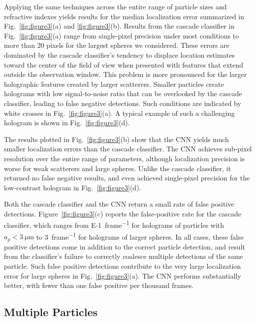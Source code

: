 Applying the same techniques across the entire range of particle
sizes and refractive indexes yields results for the median
localization error summarized in
Fig.~\ref{fig:figure3}(a) and \ref{fig:figure3}(b).
Results from the cascade classifier in Fig.~\ref{fig:figure3}(a)
range from single-pixel precision under most conditions to 
more than 20 pixels for the largest spheres we considered.
These errors are dominated by the cascade classifier's tendency
to displace location estimates toward the center of the
field of view when presented with features that extend outside
the observation window.
This problem is more pronounced
for the larger holographic features created by larger scatterers.
Smaller particles create holograms with low signal-to-noise 
ratio that can be overlooked by the cascade classifier, leading
to false negative detections.
Such conditions are indicated by white crosses in
Fig.~\ref{fig:figure3}(a).
A typical example of such a challenging hologram is
shown in Fig.~\ref{fig:figure3}(d).

The results plotted in Fig.~\ref{fig:figure3}(b) show that
the CNN yields much smaller
localization errors than the cascade classifier.
The CNN achieves sub-pixel
resolution over the entire range of parameters,
although localization precision is worse for
weak scatterers and large spheres.
Unlike the cascade classifier, it returned no
false negative results, and even achieved single-pixel
precision for the low-contrast hologram in
Fig.~\ref{fig:figure3}(d).

Both the cascade classifier and the CNN
return a small rate of false positive detections.
Figure~\ref{fig:figure3}(c) reports the false-positive
rate for the cascade classifier, which ranges from
\SI{E-1}{frame^{-1}} for holograms of particles with
$a_p < \SI{3}{\um}$
to \SI{3}{frame^{-1}} for holograms of larger spheres.
In all cases, these false positive detections come in addition
to the correct particle detection, and result from
the classifier's failure to correctly coalesce multiple detections
of the same particle.
Such false positive detections contribute to the very large
localization error for large spheres in Fig.~\ref{fig:figure3}(a).
The CNN performs substantially
better, with fewer than one false positive per thousand
frames.

\subsection{Multiple Particles}


